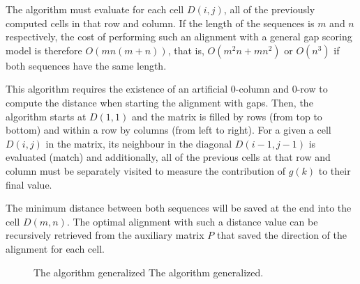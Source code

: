 The algorithm must evaluate for each cell $D(i,j)$, all of the previously computed cells in that row and
column. If the length of the sequences is $m$ and $n$ respectively, the cost of performing such an 
alignment with a general gap scoring model is therefore $O(mn (m+n))$, that is, $O(m^2n + mn^2)$ or
$O(n^3)$ if both sequences have the same length.


This algorithm requires the existence of an artificial 0-column and 0-row to compute the distance when 
starting the alignment with gaps. Then, the algorithm starts at $D(1,1)$ and the matrix is filled by 
rows (from top to bottom) and within a row by columns (from left to right). For a given a cell $D(i,j)$ 
in the matrix, its neighbour in the diagonal $D(i-1,j-1)$ is evaluated (match) and additionally, all of the
previous cells at that row and column must be separately visited to measure the contribution of $g(k)$ to
their final value.

The minimum distance between both sequences will be saved at the end into the cell $D(m,n)$. The optimal
alignment with such a distance value can be recursively retrieved from the auxiliary matrix $P$ that 
saved the direction of the alignment for each cell.

\begin{figure}[t!]
\begin{center}
          {The \citeauthor{sellers:1974a} algorithm generalized}%
          {The \citeauthor{sellers:1974a} algorithm generalized.}%
          {}
\end{center}
\end{figure}


